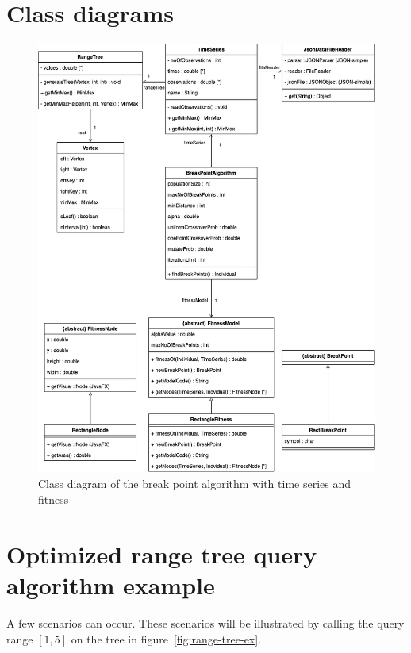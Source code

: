 \section{Class diagrams} \label{app:class-diagrams}
\begin{figure}[ht]
    \centering
    \includegraphics[width=.7\textwidth]{fig/class-diagram-algorithm.png}
    \caption{Class diagram of the break point algorithm with time series and fitness}
    \label{fig:class-diagram-algorithm}
\end{figure}

\clearpage
\section{Optimized range tree query algorithm example} \label{app:range-tree-query}

A few scenarios can
occur. These scenarios will be illustrated by calling the query range $[1,5]$ on
the tree in figure~\ref{fig:range-tree-ex}. 

